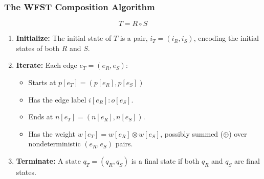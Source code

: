 \documentclass{beamer}
\begin{document}
\begin{frame}
  \frametitle{The WFST Composition Algorithm}

  \[
  T = R\circ S
  \]
  \begin{enumerate}
  \item {\bf Initialize:} The initial state of $T$ is a pair,
    $i_T=(i_R,i_S)$, encoding the initial states of both $R$ and $S$.
  \item {\bf Iterate:} Each edge $e_T=(e_R,e_S)$:
    \begin{itemize}
    \item Starts at $p[e_T]=(p[e_R],p[e_S])$
    \item Has the edge label $i[e_R]:o[e_S]$.
    \item Ends at $n[e_T]=(n[e_R],n[e_S])$.
    \item Has the weight $w[e_T]=w[e_R]\otimes w[e_S]$, possibly
      summed ($\oplus$) over nondeterministic $(e_R,e_S)$ pairs.
    \end{itemize}
  \item {\bf Terminate:} A state $q_T=(q_R,q_S)$ is a final state
    if both $q_R$ and $q_S$ are final states.
  \end{enumerate}
\end{frame}
\end{document}
